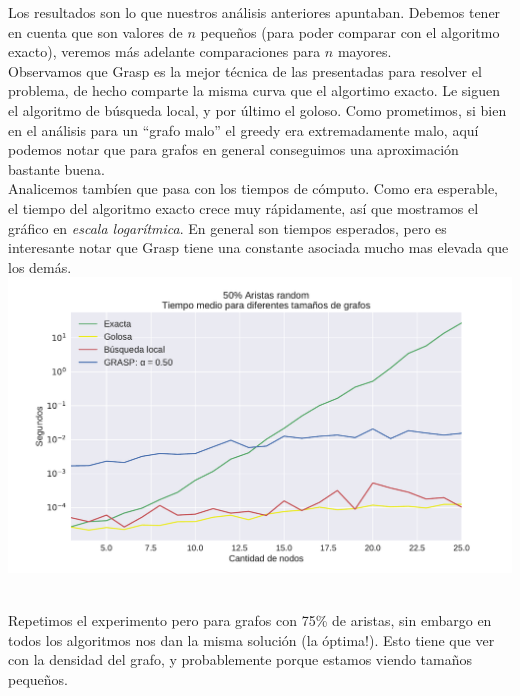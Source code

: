 Los resultados son lo que nuestros análisis anteriores apuntaban. Debemos tener en cuenta que son valores de $n$ pequeños (para poder comparar con el algoritmo exacto), veremos más adelante comparaciones para $n$ mayores. \\

Observamos que Grasp es la mejor técnica de las presentadas para resolver el problema, de hecho comparte la misma curva que el algortimo exacto. Le siguen el algoritmo de búsqueda local, y por último el goloso. Como prometimos, si bien en el análisis para un ``grafo malo'' el greedy era extremadamente malo, aquí podemos notar que para grafos en general conseguimos una aproximación bastante buena. \\

Analicemos tambíen que pasa con los tiempos de cómputo. Como era esperable, el tiempo del algoritmo exacto crece muy rápidamente, así que mostramos el gráfico en \textit{escala logarítmica}. En general son tiempos esperados, pero es interesante notar que Grasp tiene una constante asociada mucho mas elevada que los demás. \\

{\centering
    \includegraphics[width=1\textwidth]{informe/imgs/exp_random50_tiempo_todos_v2.pdf}
}
$ $ \newline

Repetimos el experimento pero para grafos con 75\% de aristas, sin embargo en todos los algoritmos nos dan la misma solución (la óptima!). Esto tiene que ver con la densidad del grafo, y probablemente porque estamos viendo tamaños pequeños. \\


